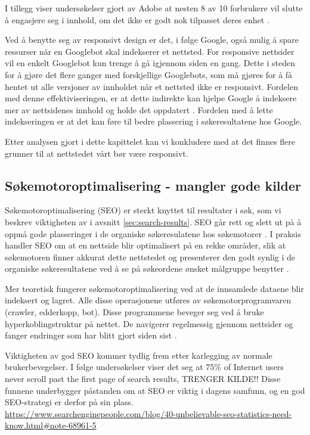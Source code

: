 I tillegg viser undersøkelser gjort av Adobe at nesten 8 av 10 forbrukere vil slutte å engasjere seg i innhold, om det ikke er godt nok tilpasset deres enhet \cite{stark2015frf}.

Ved å benytte seg av responsivt design er det, i følge Google, også mulig å spare ressurser når en Googlebot skal indekserer et nettsted. For responsive nettsider vil en enkelt Googlebot kun trenge å gå igjennom siden en gang. Dette i steden for å gjøre det flere ganger med forskjellige Googlebots, som må gjøres for å få hentet ut alle versjoner av innholdet når et nettsted ikke er responsivt. Fordelen med denne effektiviseringen, er at dette indirekte kan hjelpe Google å indeksere mer av nettsidenes innhold og holde det oppdatert \cite{google2018rwd}. Fordelen med å lette indekseringen er at det kan føre til bedre plassering i søkeresultatene hos Google.  

Etter analysen gjort i dette kapittelet kan vi konkludere med at det finnes flere grunner til at nettstedet vårt bør være responsivt.


\subsection{Søkemotoroptimalisering - mangler gode kilder}
\label{sec:concepts-seo}
Søkemotoroptimalisering (SEO) er sterkt knyttet til resultater i søk, som vi beskrev viktigheten av i avsnitt \ref{sec:search-results}. SEO går rett og slett ut på å oppnå gode plasseringer i de organiske søkeresulatene hos søkemotorer \cite[s.~16]{flensted10smg}. I praksis handler SEO om at en nettside blir optimalisert på en rekke områder, slik at søkemotoren finner akkurat dette nettstedet og presenterer den godt synlig i de organiske søkeresultatene ved å se på søkeordene ønsket målgruppe benytter \cite[s.~20]{flensted10smg}.

Mer teoretisk fungerer søkemotoroptimalisering ved at de innsamlede dataene blir indeksert og lagret. Alle disse operasjonene utføres av søkemotorprogramvaren (crawler, edderkopp,
bot). Disse programmene beveger seg ved å bruke hyperkoblingstruktur på nettet. De navigerer regelmessig gjennom nettsider og fanger endringer som har blitt gjort siden sist  \cite[s.~488]{yalccin2010search}.

Viktigheten av god SEO kommer tydlig frem etter karlegging av normale brukerbevegelser. I følge undersøkelser viser det seg at 75\% of Internet users never scroll past the first page of search results, TRENGER KILDE!! 
Disse funnene underbygger påstanden om at SEO er viktig i dagens samfunn, og en god SEO-strategi er derfor på sin plass. 
\url{https://www.searchenginepeople.com/blog/40-unbelievable-seo-statistics-need-know.html#note-68961-5 }

